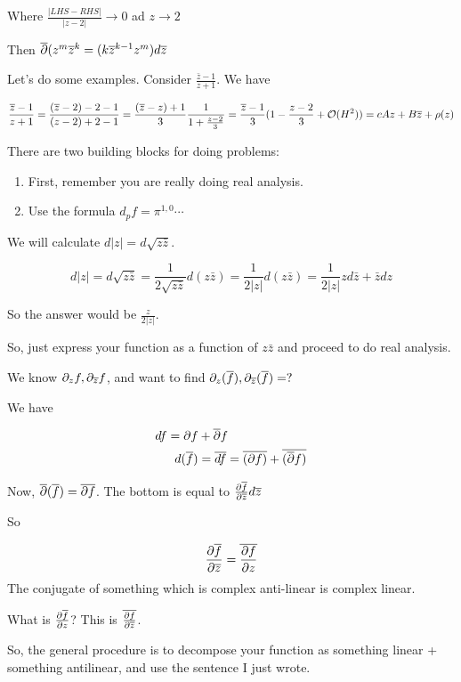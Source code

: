 \documentclass[x11names,reqno,14pt]{extarticle}
\begin{document}
Where $\frac{|LHS - RHS|}{|z - 2|} \to 0$ ad $z\to 2$

Then $\overline{\partial}(z^m\overline{z}^k = (k\overline{z}^{k - 1}z^m)d\overline{z}$

Let's do some examples. Consider $\frac{\bar{z} - 1}{z + 1}$. We have

\[
\frac{\overline{z} - 1}{z + 1} = \frac{(\overline{z} - 2) - 2 - 1}{(z - 2) + 2 - 1} = \frac{(\overline{z} - z) + 1}{3}\frac{1}{1 + \frac{z - 2}{3}} = \frac{\overline{z} - 1}{3}(1 - \frac{z - 2}{3} + \mathcal{O}(H^2)) = cAz + B\overline{z} + \rho(z)
\]

There are two building blocks for doing problems: 
\begin{enumerate}
\item First, remember you are really doing real analysis. 
\item Use the formula $d_pf = \pi^{1, 0}\cdots $
\end{enumerate}

\exm

We will calculate $d|z| = d\sqrt{z\bar{z}}$.

\[
d|z| = d\sqrt{z\bar{z}} = \frac{1}{2\sqrt{z\bar{z}}}d(z\bar{z}) = \frac{1}{2|z|}d(z\bar{z}) = \frac{1}{2|z|}zd\bar{z} + \bar{z}dz
\]

So the answer would be $\frac{z}{2|z|}$. 

So, just express your function as a function of $z\bar{z}$ and proceed to do real analysis. 

We know $\partial_zf, \partial_{\overline{z}}f$, and want to find $\partial_z(\overline{f}), \partial_{\overline{z}}(\overline{f}) = ?$

We have

\begin{align*}
df = \partial f & + \overline{\partial}f \\
d(\overline{f})  &= \overline{df} = \overline{(\partial f)} + \overline{(\overline{\partial}f)} \\
\end{align*}

Now, $\overline{\partial}(\overline{f}) = \overline{\partial f}$. The bottom is equal to $\frac{\partial \overline{f}}{\partial\overline{z}}d\overline{z}$

So 

\[
\frac{\partial \overline{f}}{\partial \overline{z}} = \overline{\frac{\partial f}{\partial z}}
\]
The conjugate of something which is complex anti-linear is complex linear. 

What is $\frac{\partial \overline{f}}{\partial z}$? This is $\overline{\frac{\partial f}{\partial \overline{z}}}$. 

So, the general procedure is to decompose your function as something linear + something antilinear, and use the sentence I just wrote. 
\end{document}
